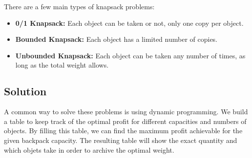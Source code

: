 \documentclass{article}
\begin{document}
There are a few main types of knapsack problems:
\begin{itemize}
  \item \textbf{0/1 Knapsack:} Each object can be taken or not, only one copy per object.
  \item \textbf{Bounded Knapsack:} Each object has a limited number of copies.
  \item \textbf{Unbounded Knapsack:} Each object can be taken any number of times, as long as the total weight allows.
\end{itemize}

\subsection{Solution}
A common way to solve these problems is using dynamic programming. We build a table to keep track of the optimal profit for different capacities and numbers of objects. By filling this table, we can find the maximum profit achievable for the given backpack capacity.
The resulting table will show the exact quantity and which objets take in order to archive the optimal weight.
\end{document}
